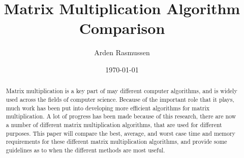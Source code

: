 \documentclass[10pt]{amsart}
\title{Matrix Multiplication Algorithm Comparison}
\author{Arden Rasmussen}
\date{\today}
\begin{document}
\maketitle

\begin{abstract}
  Matrix multiplication is a key part of may different computer algorithms, and
  is widely used across the fields of computer science. Because of the important
  role that it plays, much work has been put into developing more efficient
  algorithms for matrix multiplication. A lot of progress has been made because
  of this research, there are now a number of different matrix multiplication
  algorithms, that are used for different purposes. This paper will compare the
  best, average, and worst case time and memory requirements for these
  different matrix multiplication algorithms, and provide some guidelines as to
  when the different methods are most useful.
\end{abstract}

\begin{multicols}{2}
  
  
  
  

  \nocite{*}
  
  
\end{multicols}
\end{document}
